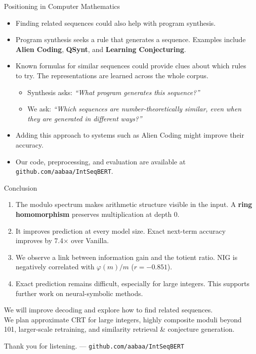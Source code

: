 \documentclass[aspectratio=169,10pt]{beamer}
\newcommand{\tightlist}{\setlength{\itemsep}{0.2em}}
\newcommand{\readout}[1]{\textcolor{readoutblue}{{\mdseries #1}}}
\begin{document}
\begin{frame}{Positioning in Computer Mathematics}
\small
  \begin{itemize}\tightlist
    \item \readout{Finding related sequences could also help with program synthesis.}
    \item \readout{Program synthesis seeks a rule that generates a sequence.}
          Examples include \textbf{Alien Coding}, \textbf{QSynt}, and \textbf{Learning Conjecturing}.
    \item \readout{Known formulas for similar sequences could provide clues about which rules to try.}
          The representations are learned across the whole corpus.
      \begin{itemize}
        \item Synthesis asks: \emph{``What program generates this sequence?''}
        \item We ask: \emph{``Which sequences are number-theoretically similar,
              even when they are generated in different ways?''}
      \end{itemize}
    \item \readout{Adding this approach to systems such as Alien Coding might improve their accuracy.}
    \item Our code, preprocessing, and evaluation are available at
          \texttt{github.com/aabaa/IntSeqBERT}.
  \end{itemize}
\end{frame}

\begin{frame}{Conclusion}
\small
  \setlength{\parskip}{0pt}
  \begin{enumerate}\tightlist
    \item \readout{The modulo spectrum makes arithmetic structure visible in the input.}
          A \textbf{ring homomorphism} preserves multiplication \alert{at depth 0}.
    \item \readout{It improves prediction at every model size.}
          Exact next-term accuracy improves by \alert{7.4$\times$} over Vanilla.
    \item \readout{We observe a link between information gain and the totient ratio.}
          NIG is negatively correlated with $\varphi(m)/m$ ($r = -0.851$).
    \item \readout{Exact prediction remains difficult, especially for large integers.}
          This supports further work on \alert{neural-symbolic methods}.
  \end{enumerate}
  \medskip
  \readout{We will improve decoding and explore how to find related sequences.}\\
  We plan approximate CRT for large integers, highly composite moduli beyond 101,
  larger-scale retraining, and \alert{similarity retrieval \& conjecture generation}.
  \medskip
  \begin{center}
    \readout{Thank you for listening.} --- \texttt{github.com/aabaa/IntSeqBERT}
  \end{center}
\end{frame}
\end{document}
